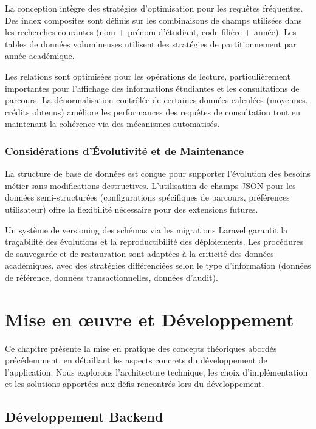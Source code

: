 \documentclass[12pt,a4paper]{report}
\begin{document}
La conception intègre des stratégies d'optimisation pour les requêtes fréquentes. Des index composites sont définis sur les combinaisons de champs utilisées dans les recherches courantes (nom + prénom d'étudiant, code filière + année). Les tables de données volumineuses utilisent des stratégies de partitionnement par année académique.

Les relations sont optimisées pour les opérations de lecture, particulièrement importantes pour l'affichage des informations étudiantes et les consultations de parcours. La dénormalisation contrôlée de certaines données calculées (moyennes, crédits obtenus) améliore les performances des requêtes de consultation tout en maintenant la cohérence via des mécanismes automatisés.

\subsection{Considérations d'Évolutivité et de Maintenance}

La structure de base de données est conçue pour supporter l'évolution des besoins métier sans modifications destructives. L'utilisation de champs JSON pour les données semi-structurées (configurations spécifiques de parcours, préférences utilisateur) offre la flexibilité nécessaire pour des extensions futures.

Un système de versioning des schémas via les migrations Laravel garantit la traçabilité des évolutions et la reproductibilité des déploiements. Les procédures de sauvegarde et de restauration sont adaptées à la criticité des données académiques, avec des stratégies différenciées selon le type d'information (données de référence, données transactionnelles, données d'audit).



\chapter{Mise en \oe uvre et Développement}

Ce chapitre présente la mise en pratique des concepts théoriques abordés précédemment, en détaillant les aspects concrets du développement de l'application. Nous explorons l'architecture technique, les choix d'implémentation et les solutions apportées aux défis rencontrés lors du développement.

\section{Développement Backend}
\end{document}
